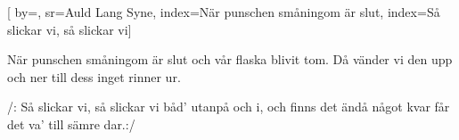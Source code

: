 

[ 		%
	by={},					%
	sr={Auld Lang Syne},					%
	index={När punschen småningom är slut}, %
	index={Så slickar vi, så slickar vi}]						%
	

\beginverse*						%
När punschen småningom är slut
och vår flaska blivit tom.
Då vänder vi den upp och ner
till dess inget rinner ur.
\endverse							%

\beginchorus						%
/: Så slickar vi, så slickar vi
båd' utanpå och i,
och finns det ändå något kvar
får det va' till sämre dar.:/
\endchorus

\endsong							%